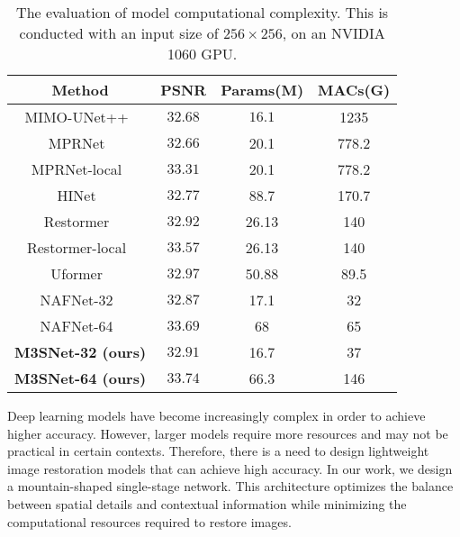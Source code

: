 \documentclass[sn-mathphys,Numbered]{sn-jnl}
\theoremstyle{thmstyleone}\newtheorem{theorem}{Theorem}\newtheorem{proposition}[theorem]{Proposition}
\theoremstyle{thmstyletwo}\newtheorem{example}{Example}\newtheorem{remark}{Remark}
\theoremstyle{thmstylethree}\newtheorem{definition}{Definition}
\begin{document}
\begin{table}
\caption{The evaluation of model computational complexity. This is conducted with an input size of $256 \times 256$, on an NVIDIA 1060 GPU. \label{tb:04}}

\begin{tabular}{ccccc}
\hline
\multicolumn{2}{c}{Method} & \multicolumn{1}{c}{PSNR} & \multicolumn{1}{c}{Params(M)} & \multicolumn{1}{c}{MACs(G)} 
\\
\hline\hline
\multicolumn{2}{c}{MIMO-UNet++~\cite{2021Rethinking}}  & \multicolumn{1}{c}{$32.68$} & \multicolumn{1}{c}{$16.1$}  & \multicolumn{1}{c}{1235} 
\\
\multicolumn{2}{c}{MPRNet~\cite{Zamir2021MPRNet}}  & \multicolumn{1}{c}{$32.66$} & \multicolumn{1}{c}{20.1}  & \multicolumn{1}{c}{778.2}  
\\
\multicolumn{2}{c}{MPRNet-local~\cite{Zamir2021MPRNet}}  & \multicolumn{1}{c}{$33.31$} & \multicolumn{1}{c}{20.1}  & \multicolumn{1}{c}{778.2}  
\\
\multicolumn{2}{c}{HINet~\cite{Chen_2021_CVPR}}  & \multicolumn{1}{c}{$32.77$} & \multicolumn{1}{c}{88.7}  & \multicolumn{1}{c}{170.7} 
\\
\multicolumn{2}{c}{Restormer~\cite{Zamir2021Restormer}}  & \multicolumn{1}{c}{$32.92$} & \multicolumn{1}{c}{26.13}  & \multicolumn{1}{c}{140} 
\\
\multicolumn{2}{c}{Restormer-local~\cite{Zamir2021Restormer}}  & \multicolumn{1}{c}{$33.57$} & \multicolumn{1}{c}{26.13}  & \multicolumn{1}{c}{140} 
\\
\multicolumn{2}{c}{Uformer~\cite{Wang_2022_CVPR}}  & \multicolumn{1}{c}{$32.97$} & \multicolumn{1}{c}{50.88}  & \multicolumn{1}{c}{89.5} 
\\
\hline
\multicolumn{2}{c}{NAFNet-32~\cite{chen2022simple}}  & \multicolumn{1}{c}{$32.87$} & \multicolumn{1}{c}{17.1}  & \multicolumn{1}{c}{32}
\\
\multicolumn{2}{c}{NAFNet-64~\cite{chen2022simple}}  & \multicolumn{1}{c}{$33.69$} & \multicolumn{1}{c}{68}  & \multicolumn{1}{c}{65}
\\
\hline
\multicolumn{2}{c}{\textbf{M3SNet-32 (ours)}}  & \multicolumn{1}{c}{$32.91$} & \multicolumn{1}{c}{16.7}  & \multicolumn{1}{c}{37}
\\
\multicolumn{2}{c}{\textbf{M3SNet-64 (ours)}}  & \multicolumn{1}{c}{$33.74$} & \multicolumn{1}{c}{66.3}  & \multicolumn{1}{c}{146}
\\
\hline
\end{tabular}
\end{table}
Deep learning models have become increasingly complex in order to achieve higher accuracy. However, larger models require more resources and may not be practical in certain contexts. Therefore, there is a need to design lightweight image restoration models that can achieve high accuracy. In our work, we design a mountain-shaped single-stage network. This architecture optimizes the balance between spatial details and contextual information while minimizing the computational resources required to restore images.
\end{document}
